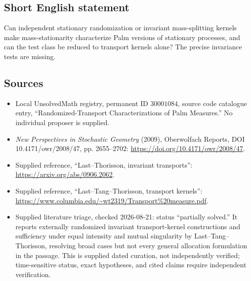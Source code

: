 \documentclass[11pt]{article}
\begin{document}
\subsection{Short English statement}
Can independent stationary randomization or invariant mass-splitting kernels make mass-stationarity characterize Palm versions of stationary processes, and can the test class be reduced to transport kernels alone? The precise invariance tests are missing.
\subsection{Sources}
\begin{itemize}
\item Local UnsolvedMath registry, permanent ID \(30001084\), source code catalogue entry, ``Randomized-Transport Characterizations of Palm Measures.'' No individual proposer is supplied.
\item \emph{New Perspectives in Stochastic Geometry} (2009), Oberwolfach Reports, DOI 10.4171/owr/2008/47, pp. 2655--2702: \url{https://doi.org/10.4171/owr/2008/47}.
\item Supplied reference, ``Last--Thorisson, invariant transports'': \url{https://arxiv.org/abs/0906.2062}.
\item Supplied reference, ``Last--Tang--Thorisson, transport kernels'': \url{https://www.columbia.edu/~wt2319/Transport%20measure.pdf}.
\item Supplied literature triage, checked 2026-08-21: status ``partially solved.'' It reports externally randomized invariant transport-kernel constructions and sufficiency under equal intensity and mutual singularity by Last--Tang--Thorisson, resolving broad cases but not every general allocation formulation in the passage. This is supplied dated curation, not independently verified; time-sensitive status, exact hypotheses, and cited claims require independent verification.
\end{itemize}
\end{document}
